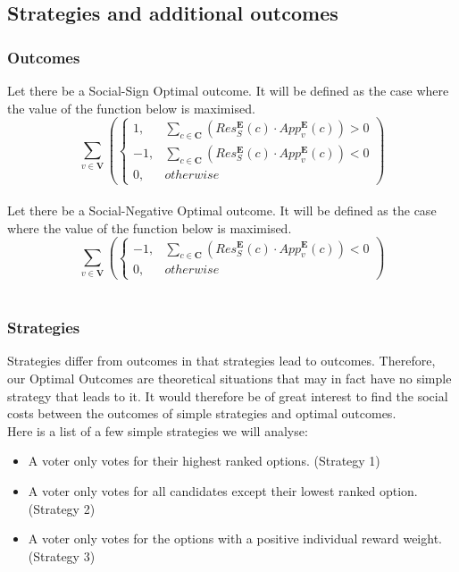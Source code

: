 \documentclass{article}
\begin{document}
\subsection{Strategies and additional outcomes}

\subsubsection{Outcomes}

Let there be a Social-Sign Optimal outcome. It will be defined as the case where the value of the function below is maximised.
\begin{equation}
\sum^{}_{v \in \boldsymbol{V}}{\left(
\begin{cases}
1, & \sum^{}_{c \in \boldsymbol{C}}{(Res^{\boldsymbol{E}}_{S}(c) \cdot App^{\boldsymbol{E}}_{v}(c))} > 0\\
-1, & \sum^{}_{c \in \boldsymbol{C}}{(Res^{\boldsymbol{E}}_{S}(c) \cdot App^{\boldsymbol{E}}_{v}(c))} < 0\\
0, & {otherwise}
\end{cases}
\right)}
\end{equation}\\

Let there be a Social-Negative Optimal outcome. It will be defined as the case where the value of the function below is maximised.
\begin{equation}
\sum^{}_{v \in \boldsymbol{V}}{\left(
\begin{cases}
-1, & \sum^{}_{c \in \boldsymbol{C}}{(Res^{\boldsymbol{E}}_{S}(c) \cdot App^{\boldsymbol{E}}_{v}(c))} < 0\\
0, & {otherwise}
\end{cases}
\right)}
\end{equation}\\

\subsubsection{Strategies}

Strategies differ from outcomes in that strategies lead to outcomes. Therefore, our Optimal Outcomes are theoretical situations that may in fact have no simple strategy that leads to it. It would therefore be of great interest to find the social costs between the outcomes of simple strategies and optimal outcomes.\\

\noindent Here is a list of a few simple strategies we will analyse:
\begin{itemize}
  \item A voter only votes for their highest ranked options. (Strategy 1)
  \item A voter only votes for all candidates except their lowest ranked option. (Strategy 2)
  \item A voter only votes for the options with a positive individual reward weight. (Strategy 3)
\end{itemize}
\end{document}
